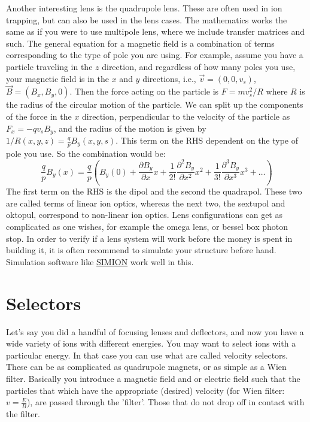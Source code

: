 Another interesting lens is the quadrupole lens.
These are often used in ion trapping, but can also be used in the lens cases.
The mathematics works the same as if you were to use multipole lens, where we include transfer matrices and such.
The general equation for a magnetic field is a combination of terms corresponding to the type of pole you are using.
For example, assume you have a particle traveling in the $z$ direction, and regardless of how many poles you use, your magnetic field is in the $x$ and $y$ directions, i.e., $\vec{v}= (0, 0, v_s)$, $\vec{B} = (B_x, B_y, 0)$.
Then the force acting on the particle is $F = mv_s^2 / R$ where $R$ is the radius of the circular motion of the particle.
We can split up the components of the force in the $x$ direction, perpendicular to the velocity of the particle as $F_x = -qv_sB_y$, and the radius of the motion is given by $1/R(x,y,z) = \frac{q}{p}B_y(x,y,s)$. This term on the RHS dependent on the type of pole you use. So the combination would be:
$$ \frac{q}{p}B_y(x) = \frac{q}{p}\left( B_y(0) + \frac{\partial B_y}{\partial x} x + \frac{1}{2!}\frac{\partial^2 B_y}{\partial x^2} x^2 + \frac{1}{3!}\frac{\partial^3 B_y}{\partial x^3} x^3 + \dots\right) $$  The first term on the RHS is the dipol and the second the quadrapol. These two are called terms of linear ion optics, whereas the next two, the sextupol and oktopul, correspond to non-linear ion optics.
Lens configurations can get as complicated as one wishes, for example the omega lens, or bessel box photon stop.
In order to verify if a lens system will work before the money is spent in building it, it is often recommend to simulate your structure before hand.
Simulation software like \href{https://simion.com/}{SIMION} work well in this.

\section{Selectors}
Let's say you did a handful of focusing lenses and deflectors, and now you have a wide variety of ions with different energies.
You may want to select ions with a particular energy.
In that case you can use what are called velocity selectors.
These can be as complicated as quadrupole magnets, or as simple as a Wien filter.
Basically you introduce a magnetic field and or electric field such that the particles that which have the appropriate (desired) velocity (for Wien filter: $v = \frac{E}{B}$), are passed through the 'filter'.
Those that do not drop off in contact with the filter.

